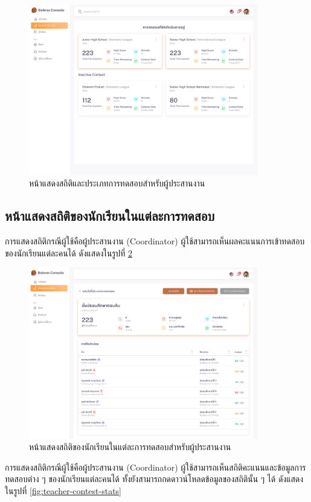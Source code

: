\begin{figure}[H]
    \centering
    \includegraphics[width=100mm,scale=1.0]{images/statisTeacher.png}
    \caption{หน้าแสดงสถิติและประเภทการทดสอบสำหรับผู้ประสานงาน}
    \label{fig:teacher-contest-dashboard}
\end{figure}

\subsection{หน้าแสดงสถิติของนักเรียนในแต่ละการทดสอบ}

การแสดงสถิติกรณีผู้ใช้คือผู้ประสานงาน (Coordinator) ผู้ใช้สามารถเห็นผลคะแนนการเข้าทดสอบของนักเรียนแต่ละคนได้ ดังแสดงในรูปที่ \ref{fig:admin-contest-stats}

\begin{figure}[H]
    \centering
    \includegraphics[width=100mm,scale=1.0]{images/teacherScore.png}
    \caption{หน้าแสดงสถิติของนักเรียนในแต่ละการทดสอบสำหรับผู้ประสานงาน}
    \label{fig:admin-contest-stats}
\end{figure}

การแสดงสถิติกรณีผู้ใช้คือผู้ประสานงาน (Coordinator) ผู้ใช้สามารถเห็นสถิติคะแนนและข้อมูลการทดสอบต่าง ๆ ของนักเรียนแต่ละคนได้ ทั้งยังสามารถกดดาวน์โหลดข้อมูลของสถิตินั้น ๆ ได้ ดังแสดงในรูปที่ \ref{fig:teacher-contest-stats}

